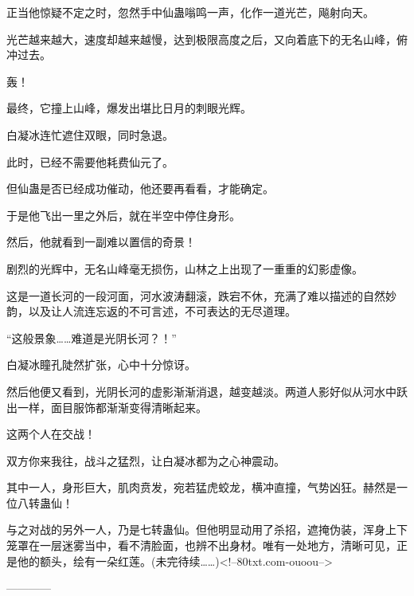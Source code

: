 \begin{this_body}
正当他惊疑不定之时，忽然手中仙蛊嗡鸣一声，化作一道光芒，飚射向天。

光芒越来越大，速度却越来越慢，达到极限高度之后，又向着底下的无名山峰，俯冲过去。

轰！

最终，它撞上山峰，爆发出堪比日月的刺眼光辉。

白凝冰连忙遮住双眼，同时急退。

此时，已经不需要他耗费仙元了。

但仙蛊是否已经成功催动，他还要再看看，才能确定。

于是他飞出一里之外后，就在半空中停住身形。

然后，他就看到一副难以置信的奇景！

剧烈的光辉中，无名山峰毫无损伤，山林之上出现了一重重的幻影虚像。

这是一道长河的一段河面，河水波涛翻滚，跌宕不休，充满了难以描述的自然妙韵，以及让人流连忘返的不可言述，不可表达的无尽道理。

“这般景象……难道是光阴长河？！”

白凝冰瞳孔陡然扩张，心中十分惊讶。

然后他便又看到，光阴长河的虚影渐渐消退，越变越淡。两道人影好似从河水中跃出一样，面目服饰都渐渐变得清晰起来。

这两个人在交战！

双方你来我往，战斗之猛烈，让白凝冰都为之心神震动。

其中一人，身形巨大，肌肉贲发，宛若猛虎蛟龙，横冲直撞，气势凶狂。赫然是一位八转蛊仙！

与之对战的另外一人，乃是七转蛊仙。但他明显动用了杀招，遮掩伪装，浑身上下笼罩在一层迷雾当中，看不清脸面，也辨不出身材。唯有一处地方，清晰可见，正是他的额头，绘有一朵红莲。(未完待续……)<!--80txt.com-ouoou-->

------------

\end{this_body}

